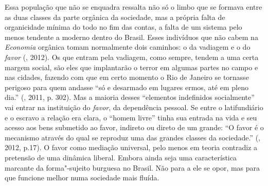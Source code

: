 Essa população que não se enquadra ressalta não só o limbo que se
formava entre as duas classes da parte orgânica da sociedade, mas a
própria falta de organicidade mínima do todo no fim das contas, a falta
de um sistema pelo menos tendente a moderno dentro do Brasil. Esses
indivíduos que não cabem na \emph{Economia} orgânica tomam normalmente
dois caminhos: o da vadiagem e o do \emph{favor} (, 2012). Os que
entram pela vadiagem, como sempre, tendem a uma certa margem social, são
eles que implantarão o terror em algumas partes no campo e nas cidades,
fazendo com que em certo momento o Rio de Janeiro se tornasse perigoso
para quem andasse ``só e desarmado em lugares ermos, até em pleno dia.''
(, 2011, p. 302). Mas a maioria desses ``elementos indefinidos
socialmente'' vai entrar na instituição do \emph{favor}, da dependência
pessoal. Se entre o latifundiário e o escravo a relação era clara, o
``homem livre'' tinha sua entrada na vida e seu acesso aos bens
submetido ao favor, indireto ou direto de um grande: ``O favor é o
mecanismo através do qual se reproduz uma das grandes classes da
sociedade.'' (, 2012, p.17). O favor como mediação universal,
pelo menos em teoria contradiz a pretensão de uma dinâmica liberal.
Embora ainda seja uma característica marcante da forma"-sujeito burguesa
no Brasil. Não para a ele se opor, mas para que funcione melhor numa
sociedade mais fluída.

